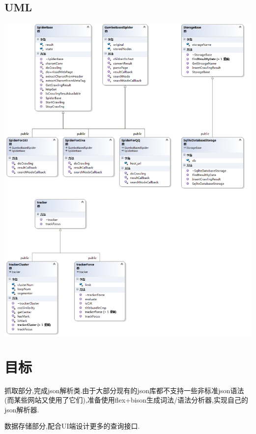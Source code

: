 \documentclass[12pt]{article}
\begin{document}
\subsection{UML}
\begin{center}
\includegraphics[width=\textwidth]{midUML.png}
\end{center}
\section{目标}
抓取部分,完成json解析类.由于大部分现有的json库都不支持一些非标准json语法(而某些网站又使用了它们),准备使用flex+bison生成词法/语法分析器,实现自己的json解析器.

数据存储部分,配合UI端设计更多的查询接口.
\end{document}
